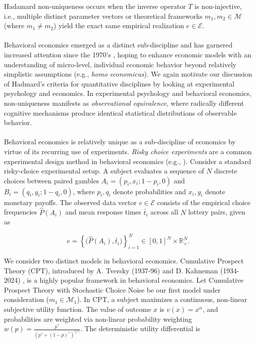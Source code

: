 \documentclass{article}
\theoremstyle{definition}
\begin{document}
Hadamard non-uniqueness occurs when the inverse operator $T$ is non-injective, i.e., multiple distinct parameter vectors or theoretical frameworks $m_1, m_2 \in \mathcal{M}$ (where $m_1 \neq m_2$) yield the exact same empirical realization $e \in \mathcal{E}$. \\
\\
Behavioral economics emerged as a distinct sub-discipline and has garnered increased attention since the 1970's \cite{KMZ06}, hoping to enhance economic models with an understanding of micro-level, individual economic behavior beyond relatively simplistic assumptions (e.g., \textit{homo economicus}). We again motivate our discussion of Hadmard's criteria for quantitative disciplines by looking at experimental psychology and economics. In experimental psychology and behavioral economics, non-uniqueness manifests as \textit{observational equivalence}, where radically different cognitive mechanisms produce identical statistical distributions of observable behavior. \\
\\
Behavioral economics is relatively unique as a sub-discipline of economics by virtue of its recurring use of experiments. \textit{Risky choice experiments} are a common experimental design method in behavioral economics (e.g., \cite{Hei+23}). Consider a standard risky-choice experimental setup. A subject evaluates a sequence of $N$ discrete choices between paired gambles $A_i = (p_i, x_i; 1-p_i, 0)$ and $B_i = (q_i, y_i; 1-q_i, 0)$, where $p_i, q_i$ denote probabilities and $x_i, y_i$ denote monetary payoffs. The observed data vector $e \in \mathcal{E}$ consists of the empirical choice frequencies $\hat{P}(A_i)$ and mean response times $\bar{t}_i$ across all $N$ lottery pairs, given as

\begin{equation}
e = \left\{ \big(\hat{P}(A_i), \bar{t}_i\big) \right\}_{i=1}^N \in [0,1]^N \times \mathbb{R}_+^N.
\end{equation}

\noindent
We consider two distinct models in behavioral economics. Cumulative Prospect Theory (CPT), introduced by A. Tversky (1937-96) and D. Kahneman (1934-2024) \cite{TK92}, is a highly popular framework in behavioral economics. Let Cumulative Prospect Theory with Stochastic Choice Noise be our first model under consideration ($m_1 \in \mathcal{M}_1$). In CPT, a subject maximizes a continuous, non-linear subjective utility function. The value of outcome $x$ is $v(x) = x^\alpha$, and probabilities are weighted via non-linear probability weighting $w(p) = \frac{p^\gamma}{(p^\gamma + (1-p)^\gamma)^{1/\gamma}}$. The deterministic utility differential is
\end{document}
